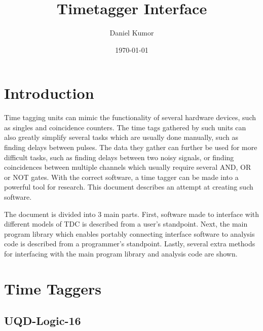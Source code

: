 \documentclass[10pt]{article}
\begin{document}
\title{Timetagger Interface}
\author{Daniel Kumor}
\date{\today}
\maketitle
{}
\tableofcontents
\clearpage
\section{Introduction}
Time tagging units can mimic the functionality of several hardware devices, such as singles and coincidence counters.
The time tags gathered by such units can also greatly simplify several tasks which are usually done manually, such as
finding delays between pulses. The data they gather can further be used for more difficult tasks, such as finding delays
between two noisy signals, or finding coincidences between multiple channels which usually require several AND, OR or NOT gates.
With the correct software, a time tagger can be made into a powerful tool for research. This document describes an attempt at
creating such software.

The document is divided into 3 main parts. First, software made to interface with different models of TDC is described from a user's standpoint. Next, the main program library which enables portably connecting interface software to analysis code is
described from a programmer's standpoint. Lastly, several extra methods for interfacing with the main program library and analysis
code are shown.

\section{Time Taggers}
\subsection{UQD-Logic-16}
\end{document}
